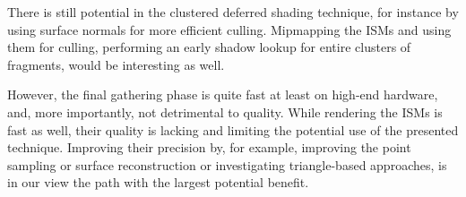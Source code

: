 There is still potential in the clustered deferred shading technique, for instance by using surface normals for more efficient culling. Mipmapping the ISMs and using them for culling, performing an early shadow lookup for entire clusters of fragments, would be interesting as well.

However, the final gathering phase is quite fast at least on high-end hardware, and, more importantly,  not detrimental to quality. While rendering the ISMs is fast as well, their quality is lacking and limiting the potential use of the presented technique. Improving their precision by, for example, improving the point sampling or surface reconstruction or investigating triangle-based approaches, is in our view the path with the largest potential benefit.
